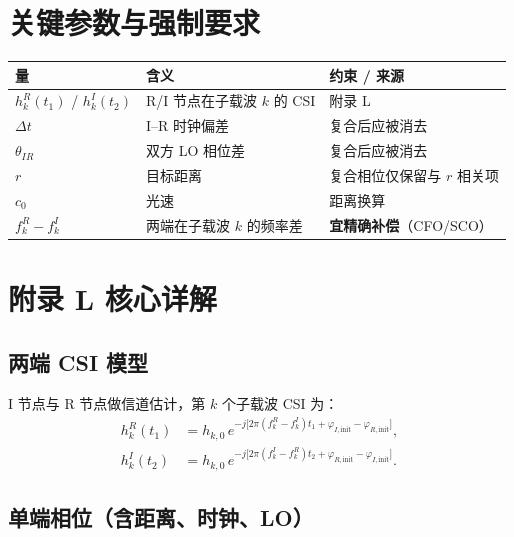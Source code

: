 \documentclass[11pt,a4paper]{ctexart}
\begin{document}
\section{关键参数与强制要求}

\begin{table}[h]
\centering
\small
\begin{tabular}{L{3cm}L{5.5cm}L{4.5cm}}
\toprule
\textbf{量} & \textbf{含义} & \textbf{约束 / 来源} \\
\midrule
$h_k^{R}(t_1)$ / $h_k^{I}(t_2)$ & R/I 节点在子载波 $k$ 的 CSI & 附录 L \\
$\Delta t$ & I--R 时钟偏差 & 复合后应被消去 \\
$\theta_{IR}$ & 双方 LO 相位差 & 复合后应被消去 \\
$r$ & 目标距离 & 复合相位仅保留与 $r$ 相关项 \\
$c_0$ & 光速 & 距离换算 \\
$f_k^{R}-f_k^{I}$ & 两端在子载波 $k$ 的频率差 & \textbf{宜精确补偿}（CFO/SCO） \\
\bottomrule
\end{tabular}
\end{table}

\section{附录 L 核心详解}

\subsection{两端 CSI 模型}

I 节点与 R 节点做信道估计，第 $k$ 个子载波 CSI 为：
\begin{align}
  h_k^{R}(t_1)
  &= h_{k,0}\,
    e^{-j\bigl[2\pi(f_k^{R}-f_k^{I})t_1
    +\varphi_{I,\mathrm{init}}-\varphi_{R,\mathrm{init}}\bigr]}, \\
  h_k^{I}(t_2)
  &= h_{k,0}\,
    e^{-j\bigl[2\pi(f_k^{I}-f_k^{R})t_2
    +\varphi_{R,\mathrm{init}}-\varphi_{I,\mathrm{init}}\bigr]}.
\end{align}

\subsection{单端相位（含距离、时钟、LO）}
\end{document}
